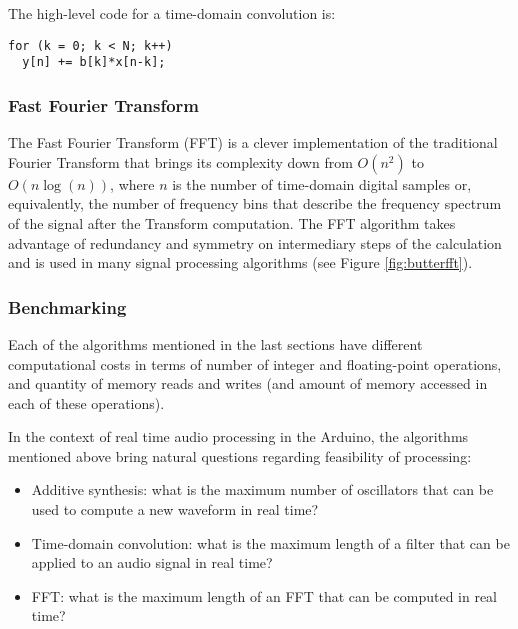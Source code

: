 
The high-level code for a time-domain convolution is:

\begin{lstlisting}
for (k = 0; k < N; k++)
  y[n] += b[k]*x[n-k];
\end{lstlisting}

\subsubsection{Fast Fourier Transform}

The Fast Fourier Transform (FFT) is a clever implementation of the traditional
Fourier Transform that brings its complexity down from $O(n^2)$ to
$O(n\log(n))$, where $n$ is the number of time-domain digital samples or,
equivalently, the number of frequency bins that describe the frequency
spectrum of the signal after the Transform computation. The FFT algorithm
takes advantage of redundancy and symmetry on intermediary steps of the
calculation and is used in many signal processing algorithms (see Figure
\ref{fig:butterfft}).




\subsubsection{Benchmarking}

Each of the algorithms mentioned in the last sections have different
computational costs in terms of number of integer and floating-point
operations, and quantity of memory reads and writes (and amount of memory
accessed in each of these operations). 

In the context of real time audio processing in the Arduino, the algorithms mentioned above
bring natural questions regarding feasibility of processing:

\begin{itemize}
  \item Additive synthesis: what is the maximum number of oscillators that can
  be used to compute a new waveform in real time?
  \item Time-domain convolution: what is the maximum length of a filter that
  can be applied to an audio signal in real time?
  \item FFT: what is the maximum length of an FFT that can be computed in real time?
\end{itemize}

